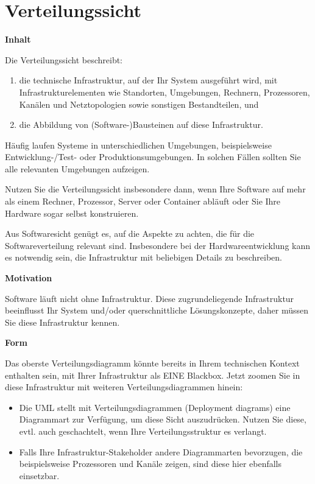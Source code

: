 \hypertarget{verteilungssicht}{%
\section{Verteilungssicht}\label{verteilungssicht}}

\textbf{Inhalt}

Die Verteilungssicht beschreibt:

\begin{enumerate}
\def\labelenumi{\arabic{enumi}.}
\tightlist
\item
  die technische Infrastruktur, auf der Ihr System ausgeführt wird, mit
  Infrastrukturelementen wie Standorten, Umgebungen, Rechnern,
  Prozessoren, Kanälen und Netztopologien sowie sonstigen Bestandteilen,
  und
\item
  die Abbildung von (Software-)Bausteinen auf diese Infrastruktur.
\end{enumerate}

Häufig laufen Systeme in unterschiedlichen Umgebungen, beispielsweise
Entwicklung-/Test- oder Produktionsumgebungen. In solchen Fällen sollten
Sie alle relevanten Umgebungen aufzeigen.

Nutzen Sie die Verteilungssicht insbesondere dann, wenn Ihre Software
auf mehr als einem Rechner, Prozessor, Server oder Container abläuft
oder Sie Ihre Hardware sogar selbst konstruieren.

Aus Softwaresicht genügt es, auf die Aspekte zu achten, die für die
Softwareverteilung relevant sind. Insbesondere bei der
Hardwareentwicklung kann es notwendig sein, die Infrastruktur mit
beliebigen Details zu beschreiben.

\textbf{Motivation}

Software läuft nicht ohne Infrastruktur. Diese zugrundeliegende
Infrastruktur beeinflusst Ihr System und/oder querschnittliche
Lösungskonzepte, daher müssen Sie diese Infrastruktur kennen.

\textbf{Form}

Das oberste Verteilungsdiagramm könnte bereits in Ihrem technischen
Kontext enthalten sein, mit Ihrer Infrastruktur als EINE Blackbox. Jetzt
zoomen Sie in diese Infrastruktur mit weiteren Verteilungsdiagrammen
hinein:

\begin{itemize}
\item
  Die UML stellt mit Verteilungsdiagrammen (Deployment diagrams) eine
  Diagrammart zur Verfügung, um diese Sicht auszudrücken. Nutzen Sie
  diese, evtl. auch geschachtelt, wenn Ihre Verteilungsstruktur es
  verlangt.
\item
  Falls Ihre Infrastruktur-Stakeholder andere Diagrammarten bevorzugen,
  die beispielsweise Prozessoren und Kanäle zeigen, sind diese hier
  ebenfalls einsetzbar.
\end{itemize}

